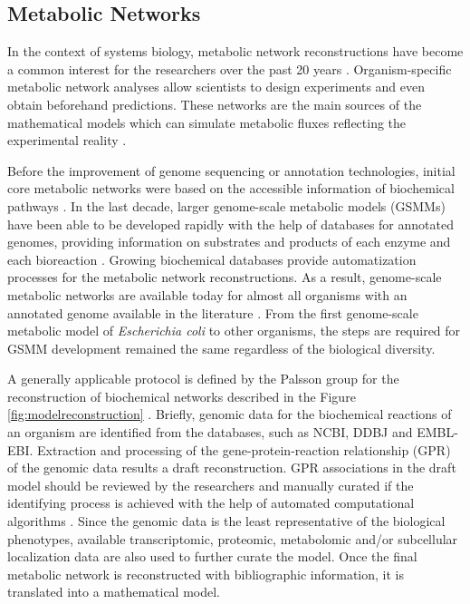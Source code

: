 \subsection{Metabolic Networks}   \label{metabolicnetworks}
In the context of systems biology, metabolic network reconstructions have become a common interest for the researchers over the past 20 years \cite{thiele2010protocol}. Organism-specific metabolic network analyses allow scientists to design experiments and even obtain beforehand predictions. These networks are the main sources of the mathematical models which can simulate metabolic fluxes reflecting the experimental reality \cite{orth2010flux}.

Before the improvement of genome sequencing or annotation technologies, initial core metabolic networks were based on the accessible information of biochemical pathways \cite{vallino1994carbon} \cite{varma1993biochemical}. In the last decade, larger genome-scale metabolic models (GSMMs) have been able to be developed rapidly with the help of databases for annotated genomes, providing information on substrates and products of each enzyme and each bioreaction \cite{feist2009reconstruction}. Growing biochemical databases provide automatization processes for the metabolic network reconstructions. As a result, genome-scale metabolic networks are available today for almost all organisms with an annotated genome available in the literature \cite{pitkanen2014comparative, kerkhoven2014applications}. From the first genome-scale metabolic model of \emph{Escherichia coli} to other organisms, the steps are required for GSMM development remained the same regardless of the biological diversity.

A generally applicable protocol is defined by the Palsson group \cite{thiele2010protocol, feist2009reconstruction} for the reconstruction of biochemical networks described in the Figure \ref{fig:modelreconstruction} \cite{chen2012metabolic}. Briefly, genomic data for the biochemical reactions of an organism are identified from the databases, such as NCBI, DDBJ and EMBL-EBI. Extraction and processing of the gene-protein-reaction relationship (GPR) of the genomic data results a draft reconstruction. GPR associations in the draft model should be reviewed by the researchers and manually curated if the identifying process is achieved with the help of automated computational algorithms \cite{pitkanen2014comparative}. Since the genomic data is the least representative of the biological phenotypes, available transcriptomic, proteomic, metabolomic and/or subcellular localization data are also used to further curate the model. Once the final metabolic network is reconstructed with bibliographic information, it is translated into a mathematical model.

